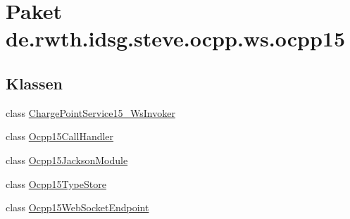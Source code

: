 \hypertarget{namespacede_1_1rwth_1_1idsg_1_1steve_1_1ocpp_1_1ws_1_1ocpp15}{\section{Paket de.\-rwth.\-idsg.\-steve.\-ocpp.\-ws.\-ocpp15}
\label{namespacede_1_1rwth_1_1idsg_1_1steve_1_1ocpp_1_1ws_1_1ocpp15}
}
\subsection*{Klassen}
\begin{DoxyCompactItemize}
\item 
class \hyperlink{classde_1_1rwth_1_1idsg_1_1steve_1_1ocpp_1_1ws_1_1ocpp15_1_1_charge_point_service15___ws_invoker}{Charge\-Point\-Service15\-\_\-\-Ws\-Invoker}
\item 
class \hyperlink{classde_1_1rwth_1_1idsg_1_1steve_1_1ocpp_1_1ws_1_1ocpp15_1_1_ocpp15_call_handler}{Ocpp15\-Call\-Handler}
\item 
class \hyperlink{classde_1_1rwth_1_1idsg_1_1steve_1_1ocpp_1_1ws_1_1ocpp15_1_1_ocpp15_jackson_module}{Ocpp15\-Jackson\-Module}
\item 
class \hyperlink{classde_1_1rwth_1_1idsg_1_1steve_1_1ocpp_1_1ws_1_1ocpp15_1_1_ocpp15_type_store}{Ocpp15\-Type\-Store}
\item 
class \hyperlink{classde_1_1rwth_1_1idsg_1_1steve_1_1ocpp_1_1ws_1_1ocpp15_1_1_ocpp15_web_socket_endpoint}{Ocpp15\-Web\-Socket\-Endpoint}
\end{DoxyCompactItemize}
